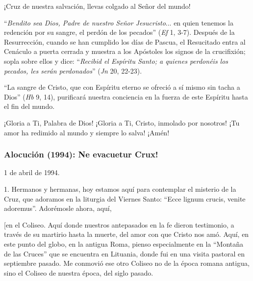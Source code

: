 			\begin{body}¡Cruz de nuestra salvación, llevas colgado al Señor del mundo!\end{body}
			
			\begin{body}“\textit{Bendito sea Dios, Padre de nuestro Señor Jesucristo}... en quien tenemos la redención por su sangre, el perdón de los pecados” (\textit{Ef} 1, 3-7). Después de la Resurrección, cuando se han cumplido los días de Pascua, el Resucitado entra al Cenáculo a puerta cerrada y muestra a los Apóstoles los signos de la crucifixión; sopla sobre ellos y dice: “\textit{Recibid el Espíritu Santo; a quienes perdonéis los pecados, les serán perdonados}” (\textit{Jn} 20, 22-23). \end{body}
			
			\begin{body}“La sangre de Cristo, que con Espíritu eterno se ofreció a sí mismo sin tacha a Dios” (\textit{Hb }9, 14), purificará nuestra conciencia en la fuerza de este Espíritu hasta el fin del mundo. \end{body}
			
			\begin{body}¡Gloria a Ti, Palabra de Dios! ¡Gloria a Ti, Cristo, inmolado por nosotros! ¡Tu amor ha redimido al mundo y siempre lo salva! ¡Amén!\end{body}
			
			\subsubsection{Alocución (1994): Ne evacuetur Crux!}
			
			\begin{referencia}1 de abril de 1994.\end{referencia}
			
			\begin{body}1. Hermanos y hermanas, hoy estamos aquí para contemplar el misterio de la Cruz, que adoramos en la liturgia del Viernes Santo: “Ecce lignum crucis, venite adoremus”. Adorémosle ahora, aquí, \begin{bodysmall}[en el Coliseo. Aquí donde nuestros antepasados en la fe dieron testimonio, a través de su martirio hasta la muerte, del amor con que Cristo nos amó. Aquí, en este punto del globo, en la antigua Roma, pienso especialmente en la “Montaña de las Cruces” que se encuentra en Lituania, donde fui en una visita pastoral en septiembre pasado. Me conmovió ese otro Coliseo no de la época romana antigua, sino el Coliseo de nuestra época, del siglo pasado. \end{bodysmall}\end{body}
			
